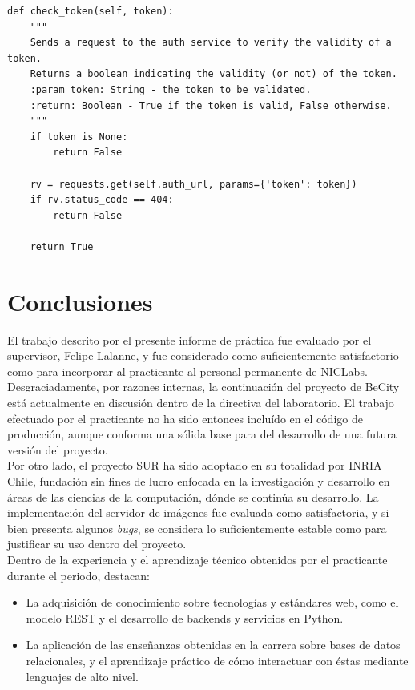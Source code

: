 \documentclass[11pt,letterpaper]{article}
\begin{document}
\begin{lstlisting}
def check_token(self, token):
    """
    Sends a request to the auth service to verify the validity of a token.
    Returns a boolean indicating the validity (or not) of the token.
    :param token: String - the token to be validated.
    :return: Boolean - True if the token is valid, False otherwise.
    """
    if token is None:
        return False

    rv = requests.get(self.auth_url, params={'token': token})
    if rv.status_code == 404:
        return False

    return True
\end{lstlisting}

\newpage
\section{Conclusiones}

El trabajo descrito por el presente informe de práctica fue evaluado por el supervisor, Felipe Lalanne, y fue considerado como suficientemente satisfactorio como para incorporar al practicante al personal permanente de NICLabs.\\

Desgraciadamente, por razones internas, la continuación del proyecto de BeCity está actualmente en discusión dentro de la directiva del laboratorio. El trabajo efectuado por el practicante no ha sido entonces incluído en el código de producción, aunque conforma una sólida base para del desarrollo de una futura versión del proyecto.\\

Por otro lado, el proyecto SUR ha sido adoptado en su totalidad por INRIA Chile, fundación sin fines de lucro enfocada en la investigación y desarrollo en áreas de las ciencias de la computación, dónde se continúa su desarrollo. La implementación del servidor de imágenes fue evaluada como satisfactoria, y si bien presenta algunos \emph{bugs}, se considera lo suficientemente estable como para justificar su uso dentro del proyecto. \\

Dentro de la experiencia y el aprendizaje técnico obtenidos por el practicante durante el periodo, destacan:
\begin{itemize}
    \item La adquisición de conocimiento sobre tecnologías y estándares web, como el modelo REST y el desarrollo de backends y servicios en Python.
    \item La aplicación de las enseñanzas obtenidas en la carrera sobre bases de datos relacionales, y el aprendizaje práctico de cómo interactuar con éstas mediante lenguajes de alto nivel.
\end{itemize}
\end{document}
